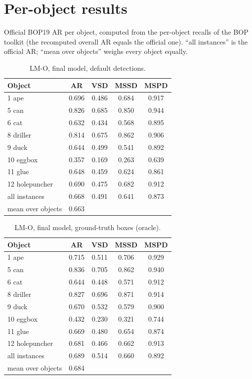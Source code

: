 \appendix
\section{Per-object results}
\label{sec:appendix:perobject}
Official BOP19 AR per object, computed from the per-object recalls of the BOP toolkit (the
recomputed overall AR equals the official one). ``all instances'' is the official AR; ``mean over
objects'' weighs every object equally.

\begin{table}[h]
  \centering
  \footnotesize
  \begin{tabular}{lcccc}
    \toprule
    Object & AR & VSD & MSSD & MSPD \\
    \midrule
1 ape & 0.696 & 0.486 & 0.684 & 0.917 \\
5 can & 0.826 & 0.685 & 0.850 & 0.944 \\
6 cat & 0.632 & 0.434 & 0.568 & 0.895 \\
8 driller & 0.814 & 0.675 & 0.862 & 0.906 \\
9 duck & 0.644 & 0.499 & 0.541 & 0.892 \\
10 eggbox & 0.357 & 0.169 & 0.263 & 0.639 \\
11 glue & 0.648 & 0.459 & 0.624 & 0.861 \\
12 holepuncher & 0.690 & 0.475 & 0.682 & 0.912 \\
\midrule
all instances & 0.668 & 0.491 & 0.641 & 0.873 \\
mean over objects & 0.663 &  &  &  \\
    \bottomrule
  \end{tabular}
  \caption{LM-O, final model, default detections.}
  \label{tab:perobj_lmo}
\end{table}

\begin{table}[h]
  \centering
  \footnotesize
  \begin{tabular}{lcccc}
    \toprule
    Object & AR & VSD & MSSD & MSPD \\
    \midrule
1 ape & 0.715 & 0.511 & 0.706 & 0.929 \\
5 can & 0.836 & 0.705 & 0.862 & 0.940 \\
6 cat & 0.644 & 0.448 & 0.571 & 0.912 \\
8 driller & 0.827 & 0.696 & 0.871 & 0.914 \\
9 duck & 0.670 & 0.532 & 0.579 & 0.900 \\
10 eggbox & 0.432 & 0.230 & 0.321 & 0.744 \\
11 glue & 0.669 & 0.480 & 0.654 & 0.874 \\
12 holepuncher & 0.681 & 0.466 & 0.662 & 0.913 \\
\midrule
all instances & 0.689 & 0.514 & 0.660 & 0.892 \\
mean over objects & 0.684 &  &  &  \\
    \bottomrule
  \end{tabular}
  \caption{LM-O, final model, ground-truth boxes (oracle).}
  \label{tab:perobj_lmo_gt}
\end{table}

